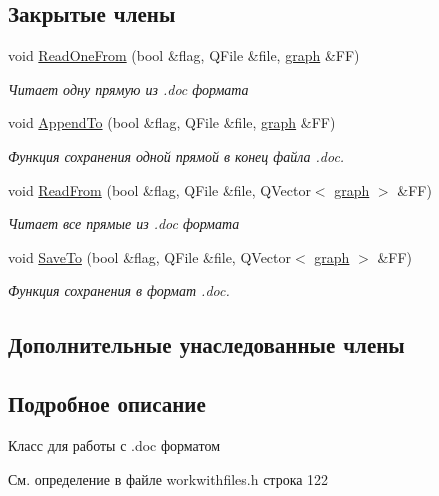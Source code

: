 \subsection*{Закрытые члены}
\begin{DoxyCompactItemize}
\item 
void \hyperlink{class_doc_a3706c27d55dbb3fe7356a6b5dbb72b5c}{Read\+One\+From} (bool \&flag, Q\+File \&file, \hyperlink{classgraph}{graph} \&FF)
\begin{DoxyCompactList}\small\item\em Читает одну прямую из .doc формата \end{DoxyCompactList}\item 
void \hyperlink{class_doc_af5c9529b9108d9155b0d725f066b3d67}{Append\+To} (bool \&flag, Q\+File \&file, \hyperlink{classgraph}{graph} \&FF)
\begin{DoxyCompactList}\small\item\em Функция сохранения одной прямой в конец файла .doc. \end{DoxyCompactList}\item 
void \hyperlink{class_doc_aa9359b8e110d9d26bcd25b68e1001743}{Read\+From} (bool \&flag, Q\+File \&file, Q\+Vector$<$ \hyperlink{classgraph}{graph} $>$ \&FF)
\begin{DoxyCompactList}\small\item\em Читает все прямые из .doc формата \end{DoxyCompactList}\item 
void \hyperlink{class_doc_a00303c942160d3e6f69b38e387f12a03}{Save\+To} (bool \&flag, Q\+File \&file, Q\+Vector$<$ \hyperlink{classgraph}{graph} $>$ \&FF)
\begin{DoxyCompactList}\small\item\em Функция сохранения в формат .doc. \end{DoxyCompactList}\end{DoxyCompactItemize}
\subsection*{Дополнительные унаследованные члены}


\subsection{Подробное описание}
Класс для работы с .doc форматом 

См. определение в файле workwithfiles.\+h строка 122



